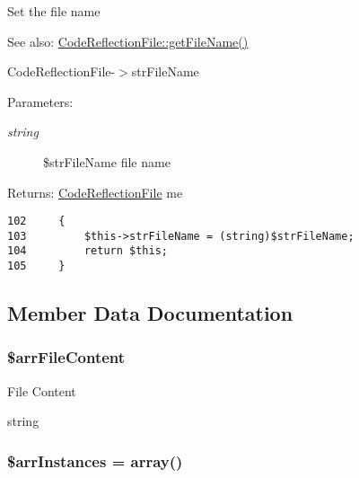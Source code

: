Set the file name

\begin{Desc}
\item[See also:]\hyperlink{class_code_reflection_file_fdeebfe3fcf5806fc79c074a6a3a6eb1}{CodeReflectionFile::getFileName()} 

CodeReflectionFile-$>$strFileName \end{Desc}
\begin{Desc}
\item[Parameters:]
\begin{description}
\item[{\em string}]\$strFileName file name \end{description}
\end{Desc}
\begin{Desc}
\item[Returns:]\hyperlink{class_code_reflection_file}{CodeReflectionFile} me \end{Desc}


\begin{Code}\begin{verbatim}102     {
103         $this->strFileName = (string)$strFileName;
104         return $this;
105     }
\end{verbatim}
\end{Code}




\subsection{Member Data Documentation}
\hypertarget{class_code_reflection_file_9d6f198c857dfdf23e2bfdfe3e6d7d15}{
\subsubsection[{\$arrFileContent}]{\setlength{\rightskip}{0pt plus 5cm}\$arrFileContent}}
\label{class_code_reflection_file_9d6f198c857dfdf23e2bfdfe3e6d7d15}


File Content

string \hypertarget{class_code_reflection_file_6bb6623babcf344a88383759b04b2b33}{
\subsubsection[{\$arrInstances}]{\setlength{\rightskip}{0pt plus 5cm}\$arrInstances = array()}}
\label{class_code_reflection_file_6bb6623babcf344a88383759b04b2b33}


